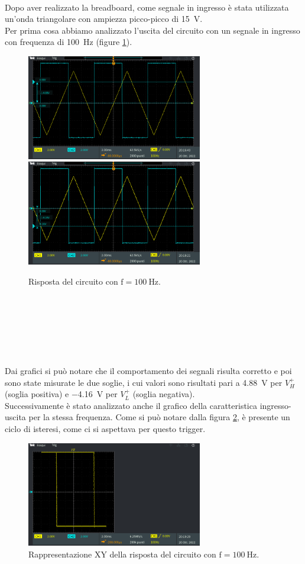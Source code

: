 \documentclass{report}
\begin{document}
\\Dopo aver realizzato la breadboard, come segnale in ingresso è stata utilizzata un'onda triangolare con ampiezza picco-picco di \SI{15}{\volt}.
\\Per prima cosa abbiamo analizzato l'uscita del circuito con un segnale in ingresso con frequenza di \SI{100}{\hertz} (figure \ref{figura:uscita21}).
\begin{figure}[h!]
	\centering
	\includegraphics[height=4.6cm]{immagini/TEK00017}
	\includegraphics[height=4.6cm]{immagini/TEK00018}
	\caption{Risposta del circuito con $\mathrm{f= \SI{100}{\hertz}}$.}
	\label{figura:uscita21}
\end{figure}
\\\\\\\\\\
\\Dai grafici si può notare che il comportamento dei segnali risulta corretto e poi sono state misurate le due soglie, i cui valori sono risultati pari a \SI{4.88}{\volt} per ${V_H^+}$ (soglia positiva) e \SI{-4.16}{\volt} per ${V_L^+}$ (soglia negativa).
\\Successivamente è stato analizzato anche il grafico della caratteristica ingresso-uscita per la stessa frequenza. Come si può notare dalla figura \ref{figura:uscita22}, è presente un ciclo di isteresi, come ci si aspettava per questo trigger.
\begin{figure}[h!]
	\centering
	\includegraphics[height=4.6cm]{immagini/TEK00019}
	\caption{Rappresentazione XY della risposta del circuito con $\mathrm{f= \SI{100}{\hertz}}$.}
	\label{figura:uscita22}
\end{figure}
\end{document}

